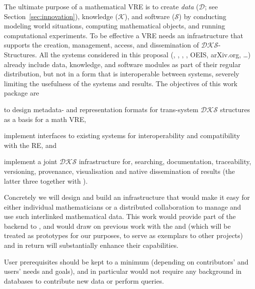 \def\DKS{\ensuremath{\mathcal{DKS}}\xspace}

\begin{workpackage}[id=dksbases,%
  title=Data/Knowledge/Software-Bases,lead=JU,
  ZHRM=12,JURM=46,UWRM=25,SARM=10,LLRM=2,PSRM=4]

\begin{wpobjectives}
  The ultimate purpose of a mathematical VRE is to create \emph{data} ($\mathcal{D}$; see
  Section~\ref{sec:innovation}), knowledge ($\mathcal{K}$), and software ($\mathcal{S}$)
  by conducting modeling world situations, computing mathematical objects, and running
  computational experiments. To be effective a VRE needs an infrastructure that supports
  the creation, management, access, and dissemination of \DKS-Structures.  All
  the systems considered in this proposal (\GAP, \Sage, \Pari, \Singular, OEIS, arXiv.org,
  \ldots) already include data, knowledge, and software modules as part of their regular
  distribution, but not in a form that is interoperable between systems, severely limiting
  the usefulness of the systems and results. The objectives of this work package are
\begin{compactenum}
\item to design metadata- and representation formats for trans-system $\mathcal{DKS}$
  structures as a basis for a math VRE, 
\item implement interfaces to existing systems for interoperability and compatibility with
  the RE, and
\item implement a joint \DKS infrastructure for, searching, documentation, traceability,
  versioning, provenance, visualisation and native dissemination of \TheProject results
  (the latter three together with ).
\end{compactenum}
Concretely we will design and build an infrastructure that would make it easy for either
individual mathematicians or a distributed collaboration to manage and use such
interlinked mathematical data. This work would provide part of the backend to ,
and would draw on previous work with the \LMFDB and \FindStat (which will be treated as
prototypes for our purposes, to serve as exemplars to other projects) and in return will
substantially enhance their capabilities.

User prerequisites should be kept to a minimum (depending on contributors' and users'
needs and goals), and in particular would not require any background in databases to
contribute new data or perform queries.
\end{wpobjectives}


\end{workpackage}
